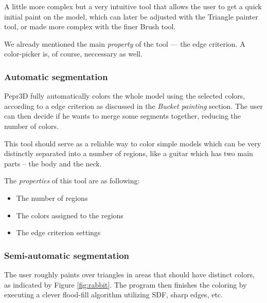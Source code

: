 A little more complex but a very intuitive tool that allows the user to get a quick initial paint on the model, which can later be adjusted with the Triangle painter tool, or made more complex with the finer Brush tool.

We already mentioned the main \textit{property} of the tool --- the edge criterion. A color-picker is, of course, neccessary as well.

\subsubsection{Automatic segmentation}
Pepr3D fully automatically colors the whole model using the selected colors, according to a edge criterion as discussed in the \textit{Bucket painting} section. The user can then decide if he wants to merge some segments together, reducing the number of colors.

This tool should serve as a reliable way to color simple models which can be very distinctly separated into a number of regions, like a guitar which has two main parts -- the body and the neck.

The \textit{properties} of this tool are as following:
\begin{itemize}
\item The number of regions
\item The colors assigned to the regions
\item The edge criterion settings
\end{itemize}

\subsubsection{Semi-automatic segmentation}
The user roughly paints over triangles in areas that should have distinct colors, as indicated by Figure \ref{fig:rabbit}. The program then finishes the coloring by executing a clever flood-fill algorithm utilizing SDF, sharp edges, etc. 

